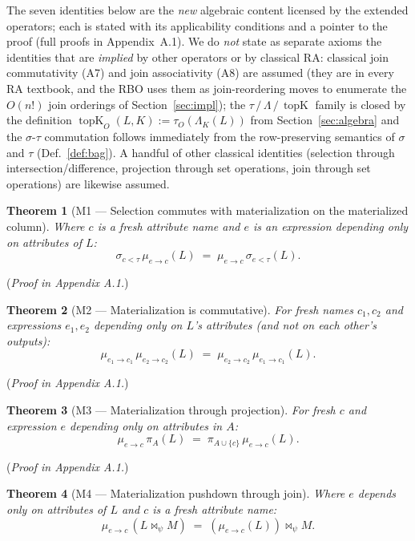 \documentclass[acmsmall,review,anonymous]{acmart}
\theoremstyle{plain}
\newtheorem{theorem}{Theorem}
\theoremstyle{definition}
\newcommand{\topK}{\operatorname{topK}}
\theoremstyle{remark}
\begin{document}
The seven identities below are the \emph{new} algebraic content
licensed by the extended operators; each is stated with its
applicability conditions and a pointer to the proof (full
proofs in Appendix~A.1). We do \emph{not} state as separate
axioms the identities that are \emph{implied} by other operators
or by classical RA: classical join commutativity (A7) and join
associativity (A8) are assumed (they are in every RA textbook,
and the RBO uses them as join-reordering moves to enumerate the
$O(n!)$ join orderings of Section~\ref{sec:impl}); the
$\tau\,/\,\Lambda\,/\,\topK$ family is closed by the definition
$\topK_O(L, K) := \tau_O(\Lambda_K(L))$ from
Section~\ref{sec:algebra} and the
$\sigma$-$\tau$ commutation follows immediately from the
row-preserving semantics of $\sigma$ and $\tau$ (Def.~\ref{def:bag}).
A handful of other classical identities (selection through
intersection/difference, projection through set operations, join
through set operations) are likewise assumed.

\begin{theorem}[M1 --- Selection commutes with materialization on the materialized column]\label{thm:m1}
Where $c$ is a fresh attribute name and $e$ is an expression
depending only on attributes of $L$:
\[
\sigma_{c < \tau}\, \mu_{e \to c}(L) \;=\; \mu_{e \to c}\, \sigma_{e < \tau}(L).
\]
\end{theorem}

(\textit{Proof in Appendix A.1.})

\begin{theorem}[M2 --- Materialization is commutative]\label{thm:m2}
For fresh names $c_1, c_2$ and expressions $e_1, e_2$ depending
only on $L$'s attributes (and not on each other's outputs):
\[
\mu_{e_1 \to c_1}\, \mu_{e_2 \to c_2}(L)
\;=\;
\mu_{e_2 \to c_2}\, \mu_{e_1 \to c_1}(L).
\]
\end{theorem}

(\textit{Proof in Appendix A.1.})

\begin{theorem}[M3 --- Materialization through projection]\label{thm:m3}
For fresh $c$ and expression $e$ depending only on attributes in $A$:
\[
\mu_{e \to c}\, \pi_A(L) \;=\; \pi_{A \cup \{c\}}\, \mu_{e \to c}(L).
\]
\end{theorem}

(\textit{Proof in Appendix A.1.})

\begin{theorem}[M4 --- Materialization pushdown through join]\label{thm:m4}
Where $e$ depends only on attributes of $L$ and $c$ is a fresh
attribute name:
\[
\mu_{e \to c}\, (L \bowtie_\psi M)
\;=\;
(\mu_{e \to c}(L)) \bowtie_\psi M.
\]
\end{theorem}
\end{document}
